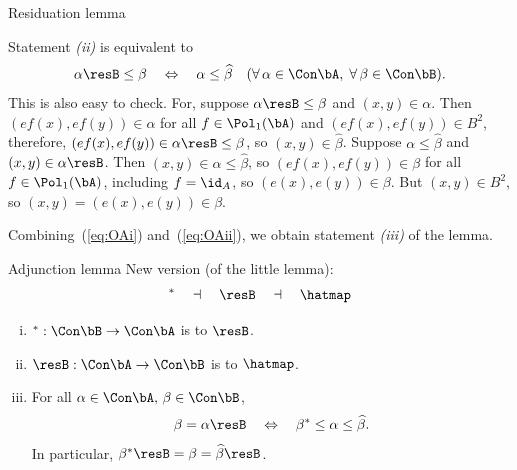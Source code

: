 \begin{frame}[fragile,label=P5Lemma]{Residuation lemma}
{{Statement {\it (ii)} is equivalent to 
  \begin{equation}
    \label{eq:OAii}
    \alpha\resB\leq \beta 
    \quad \Leftrightarrow \quad 
    \alpha \leq \widehat{\beta}
    \quad (\forall \, \alpha \in \Con\bA,\; \forall \, \beta \in \Con\bB).
  \end{equation}
  This is also easy to check.  For, suppose
  $\alpha\resB\leq \beta$ and $(x,y)\in \alpha$. Then $(ef(x), ef(y)) \in \alpha$
  for all $f \in \Pol_1(\bA)$ and $(ef(x), ef(y)) \in B^2$, therefore, 
  $(ef(x), ef(y)) \in \alpha\resB \leq \beta$, so $(x,y) \in \widehat{\beta}$.
  Suppose $\alpha \leq \widehat{\beta}$ and $(x,y) \in \alpha\resB$. 
  Then $(x,y) \in \alpha \leq  \widehat{\beta}$, so 
  $(ef(x), ef(y)) \in \beta$ for all $f\in \Pol_1(\bA)$, including $f=\id_A$, so 
  $(e(x), e(y)) \in \beta$. But $(x, y) \in B^2$, so $(x, y) = (e(x), e(y)) \in
  \beta$.

  Combining~(\ref{eq:OAi}) and~(\ref{eq:OAii}), we obtain statement {\it (iii)} of the lemma.}
}
\end{frame}

\begin{frame}[fragile,label=P5Lemma]{Adjunction lemma}
New version (of the little lemma):
\vskip2mm
{\Large 
\[^* \quad \dashv \quad \resB \quad \dashv \quad \hatmap\]
}

\begin{lemma} %
\label{lem:residuation-lemma}
  \begin{enumerate}[(i)]
  \item $^*: \Con\bB \rightarrow \Con\bA$ is  to $\resB$.
  \item $\resB : \Con\bA \rightarrow \Con\bB$ is  to $\hatmap$.
  \item For all $\alpha \in \Con\bA, \, \beta \in \Con\bB$,
    \[\beta = \alpha\resB \quad \Leftrightarrow  \quad 
    \beta^* \leq \alpha \leq \widehat{\beta}.\]
    In particular, 
    $\beta^*\resB = \beta = \widehat{\beta}\resB$.
  \end{enumerate}
\end{lemma}
\end{frame}

